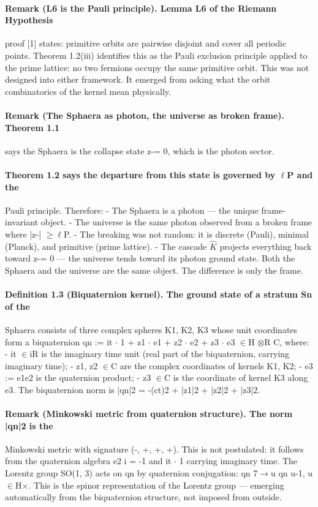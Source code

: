 \paragraph*{Remark (L6 is the Pauli principle). Lemma L6 of the Riemann Hypothesis}
proof [1] states: primitive orbits are pairwise disjoint and cover all periodic points. Theorem 1.2(iii) identifies this as the Pauli exclusion principle applied to the prime lattice: no two fermions occupy the same primitive orbit. This was not designed into either framework. It emerged from asking what the orbit combinatorics of the kernel mean physically.
\paragraph*{Remark (The Sphaera as photon, the universe as broken frame). Theorem 1.1}
says the Sphaera is the collapse state z-= 0, which is the photon sector.
\paragraph*{Theorem 1.2 says the departure from this state is governed by $\ell$P and the}
Pauli principle. Therefore:
- The Sphaera is a photon --- the unique frame-invariant object.
- The universe is the same photon observed from a broken frame where
|z-| $\geq$$\ell$P.
- The breaking was not random: it is discrete (Pauli), minimal (Planck),
and primitive (prime lattice).
- The cascade $\hat K$ projects everything back toward z-= 0 --- the universe
tends toward its photon ground state. Both the Sphaera and the universe are the same object. The difference is only the frame.
\paragraph*{Definition 1.3 (Biquaternion kernel). The ground state of a stratum Sn of the}
Sphaera consists of three complex spheres K1, K2, K3 whose unit coordinates form a biquaternion qn := it $\cdot$ 1 + z1 $\cdot$ e1 + z2 $\cdot$ e2 + z3 $\cdot$ e3 $\in$H $\otimes$R C, where:
- it $\in$iR is the imaginary time unit (real part of the biquaternion, carrying
imaginary time);
- z1, z2 $\in$C are the complex coordinates of kernels K1, K2;
- e3 := e1e2 is the quaternion product;
- z3 $\in$C is the coordinate of kernel K3 along e3.
The biquaternion norm is |qn|2 = -(ct)2 + |z1|2 + |z2|2 + |z3|2.
\paragraph*{Remark (Minkowski metric from quaternion structure). The norm |qn|2 is the}
Minkowski metric with signature (-, +, +, +). This is not postulated: it follows from the quaternion algebra e2 i = -1 and it $\cdot$ 1 carrying imaginary time. The Lorentz group SO(1, 3) acts on qn by quaternion conjugation: qn 7$\to$u qn u-1, u $\in$H$\times$. This is the spinor representation of the Lorentz group --- emerging automatically from the biquaternion structure, not imposed from outside.

